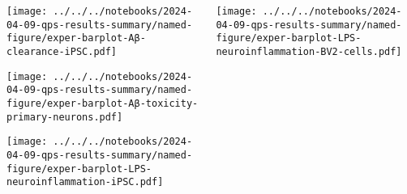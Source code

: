 \documentclass[aspectratio=169]{beamer}
\begin{document}
\begin{frame}
\begin{columns}[t]
\begin{column}{0.5\textwidth}
  \flushright

  \texttt{[image: ../../../notebooks/2024-04-09-qps-results-summary/named-figure/exper-barplot-Aβ-clearance-iPSC.pdf]}

  \texttt{[image: ../../../notebooks/2024-04-09-qps-results-summary/named-figure/exper-barplot-Aβ-toxicity-primary-neurons.pdf]}

  \texttt{[image: ../../../notebooks/2024-04-09-qps-results-summary/named-figure/exper-barplot-LPS-neuroinflammation-iPSC.pdf]}
\end{column}

\begin{column}{0.5\textwidth}
  \flushright

  \texttt{[image: ../../../notebooks/2024-04-09-qps-results-summary/named-figure/exper-barplot-LPS-neuroinflammation-BV2-cells.pdf]}


\end{column}
\end{columns}
\end{frame}
\end{document}
